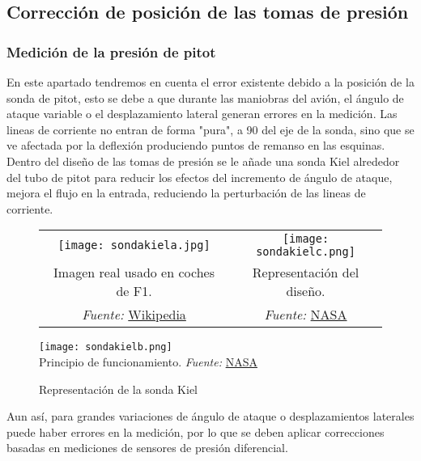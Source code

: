 \subsection{Corrección de posición de las tomas de presión}
\subsubsection{Medición de la presión de pitot}

En este apartado tendremos en cuenta el error existente debido a la posición de la sonda de pitot, esto se debe a que durante las maniobras del avión, el ángulo de ataque variable o el desplazamiento lateral generan errores en la medición. Las lineas de corriente no entran de forma "pura", a 90 \textdegree del eje de la sonda, sino que se ve afectada por la deflexión produciendo puntos de remanso en las esquinas.\\

Dentro del diseño de las tomas de presión se le añade una sonda Kiel alrededor del tubo de pitot para reducir los efectos del incremento de ángulo de ataque, mejora el flujo en la entrada, reduciendo la perturbación de las lineas de corriente.
\begin{figure}[H]
    \centering
    \begin{tabular}{c c}  
        \texttt{[image: sondakiela.jpg]} & 
        \texttt{[image: sondakielc.png]} \\
        Imagen real usado en coches de F1. & Representación del diseño. \\
        \textit{Fuente: } \href{https://en.wikipedia.org/wiki/Kiel_probe#/media/File:X-31_Kiel_Probe_Close-up_Showing_Inside.jpg}{Wikipedia} &
        \textit{Fuente: } \href{https://ntrs.nasa.gov/citations/19930094642}{NASA} 
    \end{tabular}

    \vspace{0.5cm}  %
    \texttt{[image: sondakielb.png]} \\
    Principio de funcionamiento. \textit{Fuente: } \href{https://ntrs.nasa.gov/citations/19930094642}{NASA}

    \caption{Representación de la sonda Kiel}
\end{figure}


Aun así, para grandes variaciones de ángulo de ataque o desplazamientos laterales puede haber errores en la medición, por lo que se deben aplicar correcciones basadas en mediciones de sensores de presión diferencial.\\

